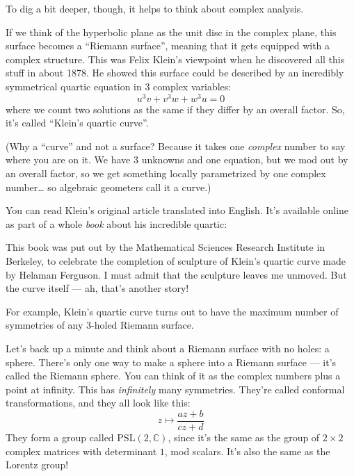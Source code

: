 \documentclass{article}
\def\tightlist{}
\renewcommand{\texttt}[1]{%
  \begingroup
  \ttfamily
  \begingroup\lccode`~=`/\lowercase{\endgroup\def~}{/\discretionary{}{}{}}%
  \begingroup\lccode`~=`[\lowercase{\endgroup\def~}{[\discretionary{}{}{}}%
  \begingroup\lccode`~=`.\lowercase{\endgroup\def~}{.\discretionary{}{}{}}%
  \catcode`/=\active\catcode`[=\active\catcode`.=\active
  \scantokens{#1\noexpand}%
  \endgroup
}
\begin{document}
To dig a bit deeper, though, it helps to think about complex analysis.

If we think of the hyperbolic plane as the unit disc in the complex
plane, this surface becomes a ``Riemann surface'', meaning that it gets
equipped with a complex structure. This was Felix Klein's viewpoint when
he discovered all this stuff in about 1878. He showed this surface could
be described by an incredibly symmetrical quartic equation in 3 complex
variables: \[u^3 v + v^3 w + w^3 u = 0\] where we count two solutions as
the same if they differ by an overall factor. So, it's called ``Klein's
quartic curve''.

(Why a ``curve'' and not a surface? Because it takes one \emph{complex}
number to say where you are on it. We have 3 unknowns and one equation,
but we mod out by an overall factor, so we get something locally
parametrized by one complex number\ldots{} so algebraic geometers call
it a curve.)

You can read Klein's original article translated into English. It's
available online as part of a whole \emph{book} about his incredible
quartic:


This book was put out by the Mathematical Sciences Research Institute in
Berkeley, to celebrate the completion of sculpture of Klein's quartic
curve made by Helaman Ferguson. I must admit that the sculpture leaves
me unmoved. But the curve itself --- ah, that's another story!

For example, Klein's quartic curve turns out to have the maximum number
of symmetries of any 3-holed Riemann surface.

Let's back up a minute and think about a Riemann surface with no holes:
a sphere. There's only one way to make a sphere into a Riemann surface
--- it's called the Riemann sphere. You can think of it as the complex
numbers plus a point at infinity. This has \emph{infinitely} many
symmetries. They're called conformal transformations, and they all look
like this: \[z\mapsto\frac{az+b}{cz+d}\] They form a group called
\(\mathrm{PSL}(2,\mathbb{C})\), since it's the same as the group of
\(2\times2\) complex matrices with determinant \(1\), mod scalars. It's
also the same as the Lorentz group!
\end{document}
